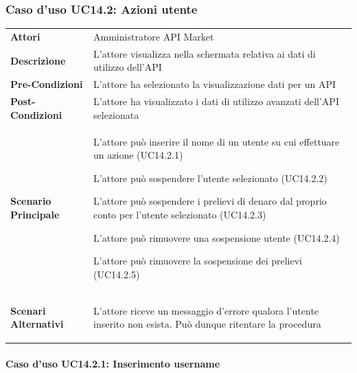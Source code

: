 \subsubsection{Caso d'uso UC14.2: Azioni utente}
\label{UC14_2}

\begin{minipage}{\linewidth}
	\begin{tabular}{ l | p{11cm}}
		\hline
		\rowcolor{Gray}
		\multicolumn{2}{c}{UC14.2 - Azioni utente} \\
		\hline
		\textbf{Attori} &  Amministratore API Market \\
		\textbf{Descrizione} & L'attore visualizza nella schermata relativa ai dati di utilizzo dell'API \\
		\textbf{Pre-Condizioni} & L'attore ha selezionato la visualizzazione dati per un API \\
		\textbf{Post-Condizioni} & L'attore ha visualizzato i dati di utilizzo avanzati dell'API selezionata \\
		\textbf{Scenario Principale} & 
		\begin{enumerate*}[label=(\arabic*.),itemjoin={\newline}]
			\item L'attore può inserire il nome di un utente su cui effettuare un azione (UC14.2.1)
			\item L'attore può sospendere l'utente selezionato (UC14.2.2)
			\item L'attore può sospendere i prelievi di denaro dal proprio conto per l'utente selezionato (UC14.2.3)
			\item L'attore può rimuovere una sospensione utente (UC14.2.4)
			\item L'attore può rimuovere la sospensione dei prelievi (UC14.2.5)
		\end{enumerate*}\\
		\textbf{Scenari Alternativi} & 
		\begin{enumerate*}[label=(\arabic*.),itemjoin={\newline}]
			\item L'attore riceve un messaggio d'errore qualora l'utente inserito non esista. Può dunque ritentare la procedura
		\end{enumerate*}\\
	\end{tabular}
\end{minipage}

\paragraph{Caso d'uso UC14.2.1: Inserimento username}
\label{UC14_2_1}

